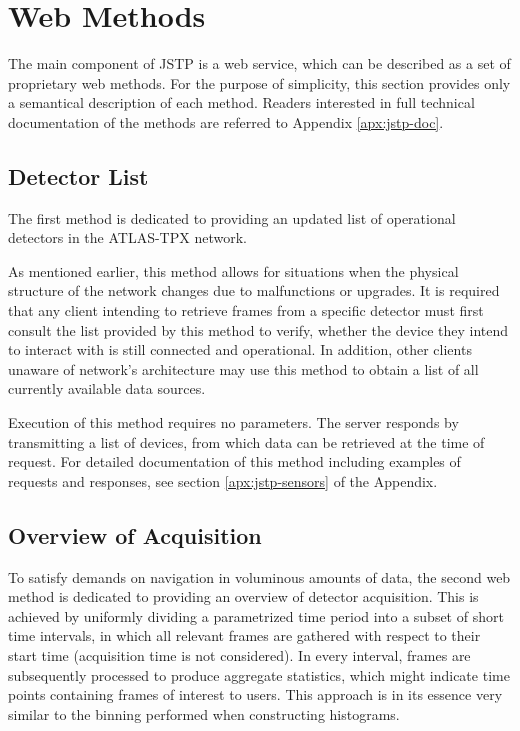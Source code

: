 \section{Web Methods}
\label{jstp:web-methods}
The main component of JSTP is a web service, which can be described as a set of proprietary web methods. For the purpose of simplicity, this section provides only a semantical description of each method. Readers interested in full technical documentation of the methods are referred to Appendix \ref{apx:jstp-doc}.

\subsection{Detector List}
The first method is dedicated to providing an updated list of operational detectors in the ATLAS-TPX network.

As mentioned earlier, this method allows for situations when the physical structure of the network changes due to malfunctions or upgrades. It is required that any client intending to retrieve frames from a specific detector must first consult the list provided by this method to verify, whether the device they intend to interact with is still connected and operational. In addition, other clients unaware of network's architecture may use this method to obtain a list of all currently available data sources.

Execution of this method requires no parameters. The server responds by transmitting a list of devices, from which data can be retrieved at the time of request. For detailed documentation of this method including examples of requests and responses, see section \ref{apx:jstp-sensors} of the Appendix.

\subsection{Overview of Acquisition}
To satisfy demands on navigation in voluminous amounts of data, the second web method is dedicated to providing an overview of detector acquisition. This is achieved by uniformly dividing a parametrized time period into a subset of short time intervals, in which all relevant frames are gathered with respect to their start time (acquisition time is not considered). In every interval, frames are subsequently processed to produce aggregate statistics, which might indicate time points containing frames of interest to users. This approach is in its essence very similar to the binning performed when constructing histograms.

